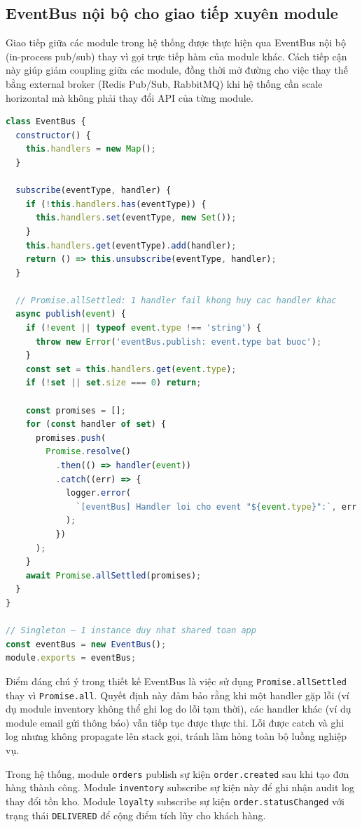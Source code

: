\subsection{EventBus nội bộ cho giao tiếp xuyên module}

Giao tiếp giữa các module trong hệ thống được thực hiện qua EventBus nội bộ (in-process pub/sub) thay vì gọi trực tiếp hàm của module khác. Cách tiếp cận này giúp giảm coupling giữa các module, đồng thời mở đường cho việc thay thế bằng external broker (Redis Pub/Sub, RabbitMQ) khi hệ thống cần scale horizontal mà không phải thay đổi API của từng module.

\begin{lstlisting}[language=JavaScript, caption={EventBus nội bộ — publish/subscribe (event-bus.js)}]
class EventBus {
  constructor() {
    this.handlers = new Map();
  }

  subscribe(eventType, handler) {
    if (!this.handlers.has(eventType)) {
      this.handlers.set(eventType, new Set());
    }
    this.handlers.get(eventType).add(handler);
    return () => this.unsubscribe(eventType, handler);
  }

  // Promise.allSettled: 1 handler fail khong huy cac handler khac
  async publish(event) {
    if (!event || typeof event.type !== 'string') {
      throw new Error('eventBus.publish: event.type bat buoc');
    }
    const set = this.handlers.get(event.type);
    if (!set || set.size === 0) return;

    const promises = [];
    for (const handler of set) {
      promises.push(
        Promise.resolve()
          .then(() => handler(event))
          .catch((err) => {
            logger.error(
              `[eventBus] Handler loi cho event "${event.type}":`, err
            );
          })
      );
    }
    await Promise.allSettled(promises);
  }
}

// Singleton — 1 instance duy nhat shared toan app
const eventBus = new EventBus();
module.exports = eventBus;
\end{lstlisting}

Điểm đáng chú ý trong thiết kế EventBus là việc sử dụng \texttt{Promise.allSettled} thay vì \texttt{Promise.all}. Quyết định này đảm bảo rằng khi một handler gặp lỗi (ví dụ module inventory không thể ghi log do lỗi tạm thời), các handler khác (ví dụ module email gửi thông báo) vẫn tiếp tục được thực thi. Lỗi được catch và ghi log nhưng không propagate lên stack gọi, tránh làm hỏng toàn bộ luồng nghiệp vụ.

Trong hệ thống, module \texttt{orders} publish sự kiện \texttt{order.created} sau khi tạo đơn hàng thành công. Module \texttt{inventory} subscribe sự kiện này để ghi nhận audit log thay đổi tồn kho. Module \texttt{loyalty} subscribe sự kiện \texttt{order.statusChanged} với trạng thái \texttt{DELIVERED} để cộng điểm tích lũy cho khách hàng.

